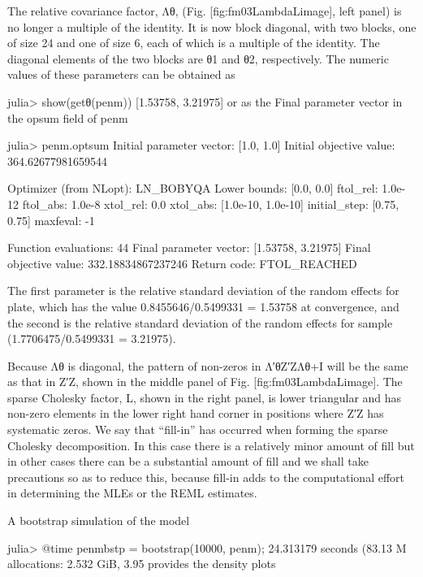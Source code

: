 The relative covariance factor, Λθ, (Fig. [fig:fm03LambdaLimage], left panel) is no longer a multiple of the identity. It is now block diagonal, with two blocks, one of size 24 and one of size 6, each of which is a multiple of the identity. The diagonal elements of the two blocks are θ1 and θ2, respectively. The numeric values of these parameters can be obtained as

julia> show(getθ(penm))
[1.53758, 3.21975]
or as the Final parameter vector in the opsum field of penm

julia> penm.optsum
Initial parameter vector: [1.0, 1.0]
Initial objective value:  364.62677981659544

Optimizer (from NLopt):   LN_BOBYQA
Lower bounds:             [0.0, 0.0]
ftol_rel:                 1.0e-12
ftol_abs:                 1.0e-8
xtol_rel:                 0.0
xtol_abs:                 [1.0e-10, 1.0e-10]
initial_step:             [0.75, 0.75]
maxfeval:                 -1

Function evaluations:     44
Final parameter vector:   [1.53758, 3.21975]
Final objective value:    332.18834867237246
Return code:              FTOL_REACHED

The first parameter is the relative standard deviation of the random effects for plate, which has the value 0.8455646/0.5499331 = 1.53758 at convergence, and the second is the relative standard deviation of the random effects for sample (1.7706475/0.5499331 = 3.21975).

Because Λθ is diagonal, the pattern of non-zeros in Λ′θZ′ZΛθ+I will be the same as that in Z′Z, shown in the middle panel of Fig. [fig:fm03LambdaLimage]. The sparse Cholesky factor, L, shown in the right panel, is lower triangular and has non-zero elements in the lower right hand corner in positions where Z′Z has systematic zeros. We say that “fill-in” has occurred when forming the sparse Cholesky decomposition. In this case there is a relatively minor amount of fill but in other cases there can be a substantial amount of fill and we shall take precautions so as to reduce this, because fill-in adds to the computational effort in determining the MLEs or the REML estimates.

A bootstrap simulation of the model

julia> @time penmbstp = bootstrap(10000, penm);
 24.313179 seconds (83.13 M allocations: 2.532 GiB, 3.95%
provides the density plots







